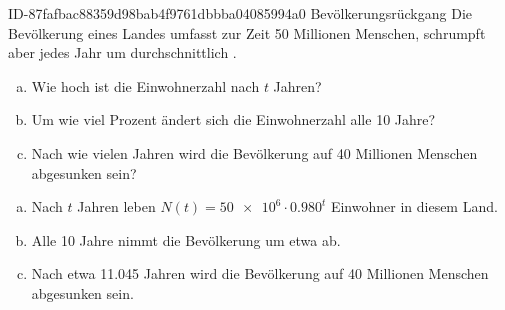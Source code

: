 \begin{exercise}
      {ID-87fafbac88359d98bab4f9761dbbba04085994a0}
      {Bevölkerungsrückgang}
  \ifproblem\problem
    Die Bevölkerung eines Landes umfasst zur Zeit 50 Millionen
    Menschen, schrumpft aber jedes Jahr um durchschnittlich .
    \begin{enumerate}[a)]
      \item Wie hoch ist die Einwohnerzahl nach $t$ Jahren?
      \item Um wie viel Prozent ändert sich die Einwohnerzahl alle
            10 Jahre?
      \item Nach wie vielen Jahren wird die Bevölkerung auf 40
            Millionen Menschen abgesunken sein?
    \end{enumerate}
  \fi
  \ifoutcome\outcome
    \begin{enumerate}[a)]
      \item Nach $t$ Jahren leben $N(t)=\num{50e6}\cdot\num{0.980}^{t}$ Einwohner
            in diesem Land.
      \item Alle 10 Jahre nimmt die Bevölkerung um etwa  ab.
      \item Nach etwa \num{11.045} Jahren wird die Bevölkerung auf 40
            Millionen Menschen abgesunken sein.
    \end{enumerate}
  \fi
\end{exercise}
